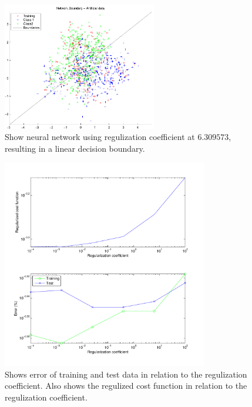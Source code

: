 \begin{figure}[!htbp]
  \centering
  \includegraphics[width=0.6\textwidth]{./images/q210b_reg5}
  \caption{Show neural network using regulization coefficient at $6.309573$, resulting in
    a linear decision boundary.}
  \label{fig:q210breg5}
\end{figure}

\begin{figure}[!htbp]
  \centering
  \includegraphics[width=0.8\textwidth]{./images/q210b_error}
  \caption{Shows error of training and test data in relation to the
    regulization coefficient. Also shows the regulized cost function
    in relation to the regulization coefficient.}
  \label{fig:q210berror}
\end{figure}
